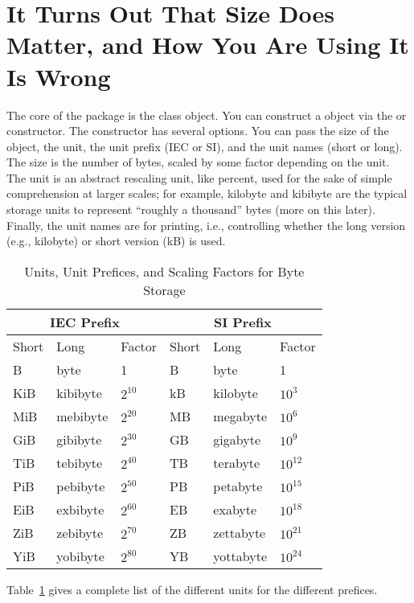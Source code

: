 \section{It Turns Out That Size Does Matter, and How You Are Using It Is Wrong}
\label{howuse}

The core of the  package is the  class object.  You can construct a  object via the  or  constructor.  The constructor has several options.  You can pass the size of the object, the unit, the unit prefix (IEC or SI), and the unit names (short or long).  The size is the number of bytes, scaled by some factor depending on the unit.  The unit is an abstract rescaling unit, like percent, used for the sake of simple comprehension at larger scales; for example, kilobyte and kibibyte are the typical storage units to represent ``roughly a thousand'' bytes (more on this later).  Finally, the unit names are for printing, i.e., controlling whether the long version (e.g., kilobyte) or short version (kB) is used.
\begin{table}[ht]
  \centering
  \begin{tabular}{|lll|lll|}\hline
    \multicolumn{3}{|c}{IEC Prefix} & \multicolumn{3}{|c|}{SI Prefix} \\\hline
    Short & Long & Factor & Short & Long & Factor\\\hline
    B & byte & 1 & B & byte & 1\\
    KiB & kibibyte & $2^{10}$ & kB & kilobyte & $10^3$\\
    MiB & mebibyte & $2^{20}$ & MB & megabyte & $10^6$\\
    GiB & gibibyte & $2^{30}$ & GB & gigabyte & $10^9$\\
    TiB & tebibyte & $2^{40}$ & TB & terabyte & $10^{12}$\\
    PiB & pebibyte & $2^{50}$ & PB & petabyte & $10^{15}$\\
    EiB & exbibyte & $2^{60}$ & EB & exabyte & $10^{18}$\\
    ZiB & zebibyte & $2^{70}$ & ZB & zettabyte & $10^{21}$\\
    YiB & yobibyte & $2^{80}$ & YB & yottabyte & $10^{24}$\\\hline
  \end{tabular}
  \caption{Units, Unit Prefices, and Scaling Factors for Byte Storage}
  \label{tab:units}
\end{table}
Table~\ref{tab:units} gives a complete list of the different units for the different prefices.

